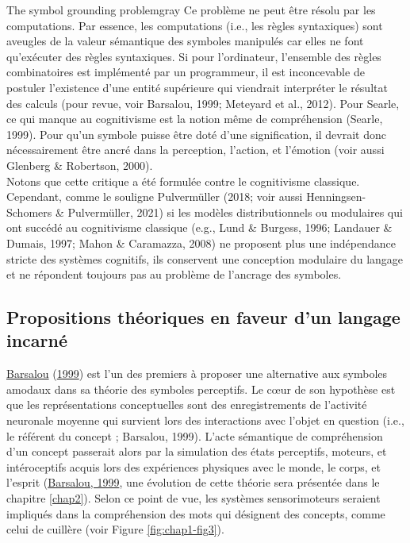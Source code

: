 \documentclass[
  a4paper,12pt,twoside,onecolumn,openright,final,oldfontcommands]{memoir}
\newcommand\chaptercolor{gray}
\begin{document}
\begin{mybox}[label=symbol]{The symbol grounding problem}{\chaptercolor}
Ce problème ne peut être résolu par les computations. Par essence, les computations (i.e., les règles syntaxiques) sont aveugles de la valeur sémantique des symboles manipulés car elles ne font qu’exécuter des règles syntaxiques. Si pour l’ordinateur, l’ensemble des règles combinatoires est implémenté par un programmeur, il est inconcevable de postuler l’existence d’une entité supérieure qui viendrait interpréter le résultat des calculs (pour revue, voir Barsalou, 1999; Meteyard et al., 2012). Pour Searle, ce qui manque au cognitivisme est la notion même de compréhension (Searle, 1999). Pour qu’un symbole puisse être doté d’une signification, il devrait donc nécessairement être ancré dans la perception, l’action, et l’émotion (voir aussi Glenberg \& Robertson, 2000).\\

Notons que cette critique a été formulée contre le cognitivisme classique. Cependant, comme le souligne Pulvermüller (2018; voir aussi Henningsen-Schomers \& Pulvermüller, 2021) si les modèles distributionnels ou modulaires qui ont succédé au cognitivisme classique (e.g., Lund \& Burgess, 1996; Landauer \& Dumais, 1997; Mahon \& Caramazza, 2008) ne proposent plus une indépendance stricte des systèmes cognitifs, ils conservent une conception modulaire du langage et ne répondent toujours pas au problème de l’ancrage des symboles.

\end{mybox}

\hypertarget{princeps}{%
\subsection{Propositions théoriques en faveur d'un langage incarné}\label{princeps}}

\protect\hyperlink{ref-barsalou_perceptual_1999}{Barsalou} (\protect\hyperlink{ref-barsalou_perceptual_1999}{1999}) est l'un des premiers à proposer une alternative aux symboles amodaux dans sa théorie des symboles perceptifs. Le cœur de son hypothèse est que les représentations conceptuelles sont des enregistrements de l'activité neuronale moyenne qui survient lors des interactions avec l'objet en question (i.e., le référent du concept ; Barsalou, 1999). L'acte sémantique de compréhension d'un concept passerait alors par la simulation des états perceptifs, moteurs, et intéroceptifs acquis lors des expériences physiques avec le monde, le corps, et l'esprit (\protect\hyperlink{ref-barsalou_perceptual_1999}{Barsalou, 1999}, une évolution de cette théorie sera présentée dans le chapitre \ref{chap2}). Selon ce point de vue, les systèmes sensorimoteurs seraient impliqués dans la compréhension des mots qui désignent des concepts, comme celui de cuillère (voir Figure \ref{fig:chap1-fig3}).
\end{document}
